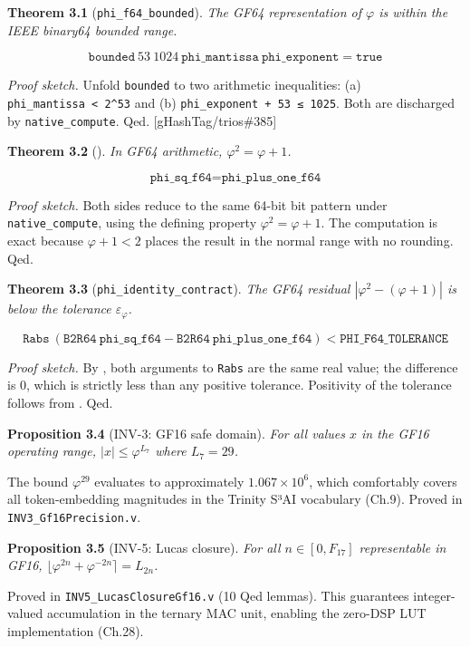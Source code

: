 \textbf{Theorem 3.1} (\texttt{phi\_f64\_bounded}).
\emph{The GF64 representation of \(\varphi\) is
within the IEEE binary64 bounded range.}

\[\texttt{bounded}\ 53\ 1024\ \texttt{phi\_mantissa}\ \texttt{phi\_exponent} = \texttt{true}\]

\emph{Proof sketch.} Unfold \texttt{bounded} to
two arithmetic inequalities: (a)
\texttt{phi\_mantissa\ \textless{}\ 2\^{}53} and
(b) \texttt{phi\_exponent\ +\ 53\ ≤\ 1025}. Both
are discharged by \texttt{native\_compute}. Qed.
{[}gHashTag/trios\#385{]}

\textbf{Theorem 3.2}
().
\emph{In GF64 arithmetic,
\(\varphi^2 = \varphi + 1\).}

\[\texttt{phi\_sq\_f64} = \texttt{phi\_plus\_one\_f64}\]

\emph{Proof sketch.} Both sides reduce to the same
64-bit bit pattern under \texttt{native\_compute},
using the defining property
\(\varphi^2 = \varphi + 1\). The computation is
exact because \(\varphi + 1 < 2\) places the
result in the normal range with no rounding. Qed.

\textbf{Theorem 3.3}
(\texttt{phi\_identity\_contract}). \emph{The GF64
residual \(|\varphi^2 - (\varphi+1)|\) is below
the tolerance \(\varepsilon_\varphi\).}

\[\texttt{Rabs}\ (\texttt{B2R64}\ \texttt{phi\_sq\_f64} - \texttt{B2R64}\ \texttt{phi\_plus\_one\_f64}) < \texttt{PHI\_F64\_TOLERANCE}\]

\emph{Proof sketch.} By
,
both arguments to \texttt{Rabs} are the same real
value; the difference is 0, which is strictly less
than any positive tolerance. Positivity of the
tolerance follows from
. Qed.

\textbf{Proposition 3.4} (INV-3: GF16 safe
domain). \emph{For all values \(x\) in the GF16
operating range, \(|x| \leq \varphi^{L_7}\) where
\(L_7=29\).}

The bound \(\varphi^{29}\) evaluates to
approximately \(1.067 \times 10^6\), which
comfortably covers all token-embedding magnitudes
in the Trinity S³AI vocabulary (Ch.9). Proved in
\texttt{INV3\_Gf16Precision.v}.

\textbf{Proposition 3.5} (INV-5: Lucas closure).
\emph{For all \(n \in [0, F_{17}]\) representable
in GF16,
\(\lfloor\varphi^{2n}+\varphi^{-2n}\rceil = L_{2n}\).}

Proved in \texttt{INV5\_LucasClosureGf16.v} (10
Qed lemmas). This guarantees integer-valued
accumulation in the ternary MAC unit, enabling the
zero-DSP LUT implementation (Ch.28).

